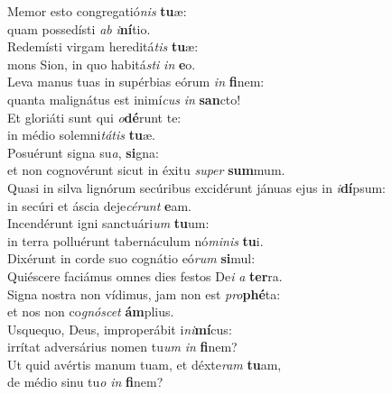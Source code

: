 \evenverse Memor esto congregatió\textit{nis} \textbf{tu}æ:~\*\\
\evenverse quam possedísti \textit{ab} \textit{i}\textbf{ní}tio.\\
\oddverse Redemísti virgam hereditá\textit{tis} \textbf{tu}æ:~\*\\
\oddverse mons Sion, in quo habitá\textit{sti} \textit{in} \textbf{e}o.\\
\evenverse Leva manus tuas in supérbias eórum \textit{in} \textbf{fi}nem:~\*\\
\evenverse quanta malignátus est inimí\textit{cus} \textit{in} \textbf{san}cto!\\
\oddverse Et gloriáti sunt qui \textit{o}\textbf{dé}runt te:~\*\\
\oddverse in médio solemni\textit{tá}\textit{tis} \textbf{tu}æ.\\
\evenverse Posuérunt signa su\textit{a}, \textbf{si}gna:~\*\\
\evenverse et non cognovérunt sicut in éxitu \textit{su}\textit{per} \textbf{sum}mum.\\
\oddverse Quasi in silva lignórum secúribus excidérunt jánuas ejus in \textit{i}\textbf{dí}psum:~\*\\
\oddverse in secúri et áscia deje\textit{cé}\textit{runt} \textbf{e}am.\\
\evenverse Incendérunt igni sanctuári\textit{um} \textbf{tu}um:~\*\\
\evenverse in terra polluérunt tabernáculum nó\textit{mi}\textit{nis} \textbf{tu}i.\\
\oddverse Dixérunt in corde suo cognátio eó\textit{rum} \textbf{si}mul:~\*\\
\oddverse Quiéscere faciámus omnes dies festos De\textit{i} \textit{a} \textbf{ter}ra.\\
\evenverse Signa nostra non vídimus, jam non est \textit{pro}\textbf{phé}ta:~\*\\
\evenverse et nos non co\textit{gnó}\textit{scet} \textbf{ám}plius.\\
\oddverse Usquequo, Deus, improperábit i\textit{ni}\textbf{mí}cus:~\*\\
\oddverse irrítat adversárius nomen tu\textit{um} \textit{in} \textbf{fi}nem?\\
\evenverse Ut quid avértis manum tuam, et déxte\textit{ram} \textbf{tu}am,~\*\\
\evenverse de médio sinu tu\textit{o} \textit{in} \textbf{fi}nem?\\
